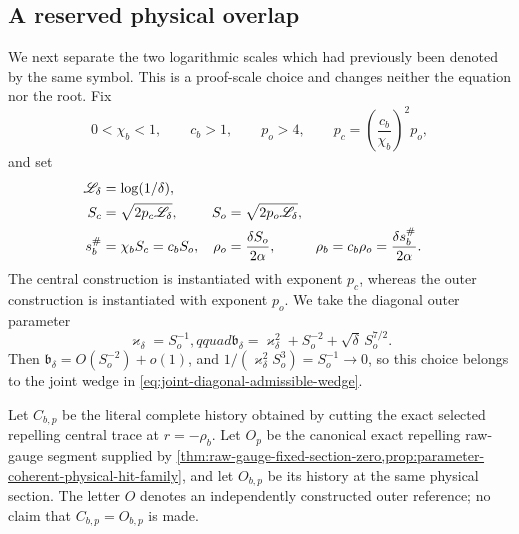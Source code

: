 \subsection{A reserved physical overlap}

We next separate the two logarithmic scales which had previously been
denoted by the same symbol.  This is a proof-scale choice and changes
neither the equation nor the root.  Fix
\begin{equation}
 0<\chi_b<1,\qquad c_b>1,\qquad p_o>4,
 \qquad p_c=\left(\frac{c_b}{\chi_b}\right)^2p_o,       \label{eq:anchor-reserved-scale-constants}
\end{equation}
and set
\begin{align}
 \mathscr L_\delta&=\log(1/\delta),\notag\\
 S_c&=\sqrt{2p_c\mathscr L_\delta},&
 S_o&=\sqrt{2p_o\mathscr L_\delta},\notag\\
 s_b^\#&=\chi_bS_c=c_bS_o,&
 \rho_o&=\frac{\delta S_o}{2\alpha},&
 \rho_b&=c_b\rho_o=\frac{\delta s_b^\#}{2\alpha}.
                                                               \label{eq:anchor-reserved-scale-identities}
\end{align}
The central construction is instantiated with exponent \(p_c\), whereas
the outer construction is instantiated with exponent \(p_o\).  We take the
diagonal outer parameter
\begin{equation}
 \varkappa_\delta=S_o^{-1},qquad
 \mathfrak b_\delta
 =\varkappa_\delta^2+S_o^{-2}
       +\sqrt\delta\,S_o^{7/2}.                         \label{eq:anchor-reserved-diagonal-choice}
\end{equation}
Then \(\mathfrak b_\delta=O(S_o^{-2})+o(1)\), and
\(1/(\varkappa_\delta^2S_o^3)=S_o^{-1}\to0\), so this choice belongs to
the joint wedge in \cref{eq:joint-diagonal-admissible-wedge}.

Let \(C_{b,p}\) be the literal complete history obtained by cutting the
exact selected repelling central trace at \(r=-\rho_b\).  Let
\(O_p\) be the canonical exact repelling raw-gauge segment supplied by
\cref{thm:raw-gauge-fixed-section-zero,prop:parameter-coherent-physical-hit-family},
and let \(O_{b,p}\) be its history at the same physical section.  The
letter \(O\) denotes an independently constructed outer reference; no
claim that \(C_{b,p}=O_{b,p}\) is made.

